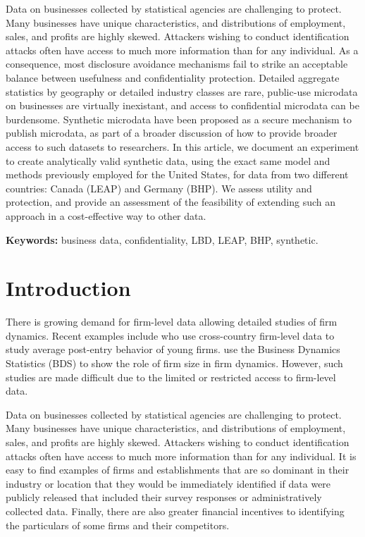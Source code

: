 \documentclass[10pt,twoside]{article}
\begin{document}
\begin{addmargin}[6mm]{6mm}
\begin{small}
\begin{singlespace}

Data on businesses collected by statistical agencies are challenging to protect. Many businesses have unique characteristics, and distributions of employment, sales, and profits are highly skewed. Attackers wishing to conduct identification attacks often have access to much more information than for any individual. As a consequence, most disclosure avoidance mechanisms  fail to strike an acceptable balance between usefulness and confidentiality protection. Detailed aggregate statistics by geography or detailed industry classes are rare, public-use microdata on businesses are virtually inexistant, and access to confidential microdata can be burdensome. 
Synthetic microdata have been proposed as a secure mechanism to publish microdata, as part of a broader discussion of how  to provide broader access to such datasets to researchers.
In this article, we document an experiment to create analytically valid synthetic data, using the exact same model and methods previously employed for the United States, for data from two different countries: Canada (\ac{LEAP}) and Germany (\ac{BHP}). We assess utility and protection, and provide an assessment of the feasibility of extending such an approach in a cost-effective way to other data.

\smallskip \noindent \textbf{Keywords:} business data, confidentiality, LBD, LEAP, BHP, synthetic.

\end{singlespace}
\end{small}
\end{addmargin}

\smallskip
\acresetall
\section{Introduction}
There is growing demand for firm-level data allowing detailed studies of firm dynamics. Recent examples include \textcite{NBERc0480} who use cross-country firm-level data to study average post-entry behavior of young firms. \textcite{10.1257/aer.20141280} use the Business Dynamics Statistics (BDS) to show the role of firm size in firm dynamics. However, such studies are made difficult due to the limited or restricted access to firm-level data.

Data on businesses collected by statistical agencies are challenging to protect. Many businesses have unique characteristics, and distributions of employment, sales, and profits are highly skewed. Attackers wishing to conduct identification attacks often have access to much more information than for any individual. It is easy to find examples of firms and establishments that are so dominant in their industry or location that they would be immediately identified if  data were publicly released that included their survey responses or administratively collected data. Finally, there are also greater financial incentives to identifying the particulars of some firms and their competitors.
\end{document}
